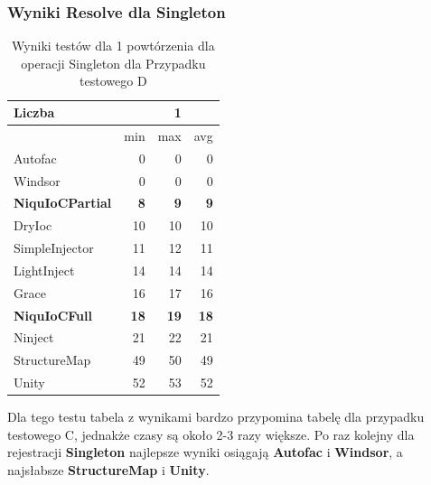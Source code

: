 \documentclass[12pt]{article}
\begin{document}
\subsubsection{Wyniki Resolve dla Singleton}
\begin{table}[H]
\captionsetup{belowskip=0pt,aboveskip=0pt}
\begin{center}
\begin{small}
	\begin{tabular}{ | l | r r r | }
    		\hline
Liczba & & 1 & \\ \hline
 & min & max & avg \\ \hline
Autofac & 0 & 0 & 0 \\ \hline
Windsor & 0 & 0 & 0 \\ \hline
\textbf{NiquIoCPartial} & \textbf{8} & \textbf{9} & \textbf{9} \\ \hline
DryIoc & 10 & 10 & 10 \\ \hline
SimpleInjector & 11 & 12 & 11 \\ \hline
LightInject & 14 & 14 & 14 \\ \hline
Grace & 16 & 17 & 16 \\ \hline
\textbf{NiquIoCFull} & \textbf{18} & \textbf{19} & \textbf{18} \\ \hline
Ninject & 21 & 22 & 21 \\ \hline
StructureMap & 49 & 50 & 49 \\ \hline
Unity & 52 & 53 & 52 \\ \hline
  	\end{tabular}
\end{small}
\end{center}
\caption{Wyniki testów dla 1 powtórzenia dla operacji Singleton dla Przypadku testowego D}
\label{TestCaseD_Singleton1}
\end{table}
Dla tego testu tabela z wynikami bardzo przypomina tabelę dla przypadku testowego C, jednakże czasy są około 2-3 razy większe. Po raz kolejny dla rejestracji \textbf{Singleton} najlepsze wyniki osiągają \textbf{Autofac} i \textbf{Windsor}, a najsłabsze \textbf{StructureMap} i \textbf{Unity}.
\\ \\
\end{document}
